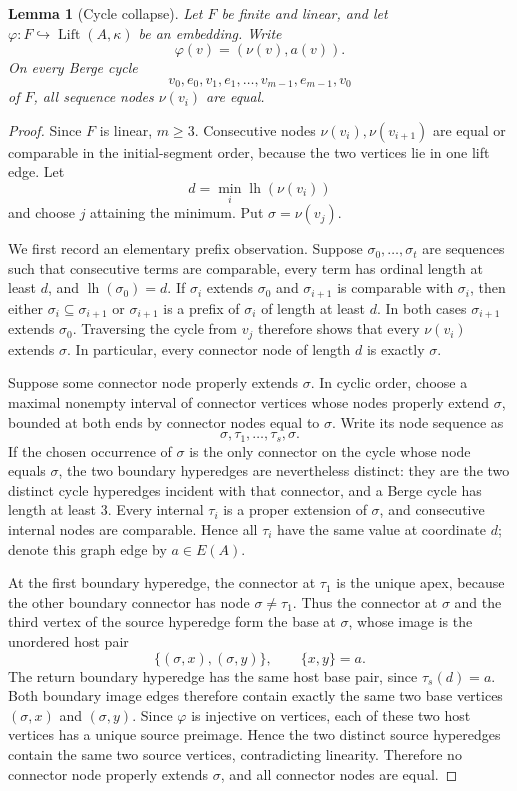 \documentclass[11pt]{amsart}
\newtheorem{lemma}[lemma]{Lemma}
\theoremstyle{definition}
\theoremstyle{remark}
\numberwithin{equation}{section}
\newcommand{\Lift}{\operatorname{Lift}}
\newcommand{\lh}{\operatorname{lh}}
\begin{document}
\begin{lemma}[Cycle collapse]
\label{lem:cycle-collapse}
Let $F$ be finite and linear, and let
$\varphi:F\hookrightarrow\Lift(A,\kappa)$ be an embedding.  Write
\[
 \varphi(v)=(\nu(v),a(v)).
\]
On every Berge cycle
\[
 v_0,e_0,v_1,e_1,\ldots,v_{m-1},e_{m-1},v_0
\]
of $F$, all sequence nodes $\nu(v_i)$ are equal.
\end{lemma}

\begin{proof}
Since $F$ is linear, $m\ge3$.  Consecutive nodes
$\nu(v_i),\nu(v_{i+1})$ are equal or comparable in the initial-segment
order, because the two vertices lie in one lift edge.  Let
\[
 d=\min_i\lh(\nu(v_i))
\]
and choose $j$ attaining the minimum.  Put $\sigma=\nu(v_j)$.

We first record an elementary prefix observation.  Suppose
$\sigma_0,\ldots,\sigma_t$ are sequences such that consecutive terms are
comparable, every term has ordinal length at least $d$, and
$\lh(\sigma_0)=d$.  If $\sigma_i$ extends $\sigma_0$ and
$\sigma_{i+1}$ is comparable with $\sigma_i$, then either
$\sigma_i\subseteq\sigma_{i+1}$ or $\sigma_{i+1}$ is a prefix of
$\sigma_i$ of length at least $d$.  In both cases $\sigma_{i+1}$ extends
$\sigma_0$.  Traversing the cycle from $v_j$ therefore shows that every
$\nu(v_i)$ extends $\sigma$.  In particular, every connector node of
length $d$ is exactly $\sigma$.

Suppose some connector node properly extends $\sigma$.  In cyclic order,
choose a maximal nonempty interval of connector vertices whose nodes
properly extend $\sigma$, bounded at both ends by connector nodes equal
to $\sigma$.  Write its node sequence as
\[
 \sigma,\tau_1,\ldots,\tau_s,\sigma.
\]
If the chosen occurrence of $\sigma$ is the only connector on the cycle
whose node equals $\sigma$, the two boundary hyperedges are nevertheless
distinct: they are the two distinct cycle hyperedges incident with that
connector, and a Berge cycle has length at least $3$.  Every internal
$\tau_i$ is a proper extension of $\sigma$, and consecutive internal
nodes are comparable.  Hence all $\tau_i$ have the same value at
coordinate $d$; denote this graph edge by $a\in E(A)$.

At the first boundary hyperedge, the connector at $\tau_1$ is the unique
apex, because the other boundary connector has node $\sigma\ne\tau_1$.
Thus the connector at $\sigma$ and the third vertex of the source
hyperedge form the base at $\sigma$, whose image is the unordered host
pair
\[
 \{(\sigma,x),(\sigma,y)\},\qquad \{x,y\}=a.
\]
The return boundary hyperedge has the same host base pair, since
$\tau_s(d)=a$.  Both boundary image edges therefore contain exactly the
same two base vertices $(\sigma,x)$ and $(\sigma,y)$.  Since $\varphi$ is
injective on vertices, each of these two host vertices has a unique source
preimage.  Hence the two distinct source hyperedges contain the same two
source vertices, contradicting linearity.  Therefore no connector node
properly extends $\sigma$, and all connector nodes are equal.
\end{proof}
\end{document}
